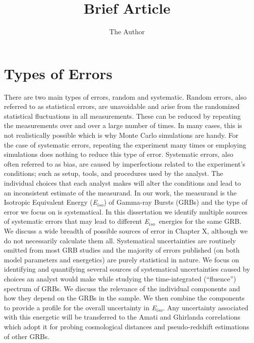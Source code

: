 \documentclass[11pt, oneside]{article}   	%
\title{Brief Article}
\author{The Author}
\newcommand{\eiso}{\textit{E$_{iso}$}}
\begin{document}
\maketitle

\section{Types of Errors}
There are two main types of errors, random and systematic. Random errors, also referred to as statistical errors, are unavoidable and arise from the randomized statistical fluctuations in all measurements. These can be reduced by repeating the measurements over and over a large number of times. In many cases, this is not realistically possible which is why Monte Carlo simulations are handy. For the case of systematic errors, repeating the experiment many times or employing simulations does nothing to reduce this type of error. Systematic errors, also often referred to as bias, are caused by imperfections related to the experiment's conditions; such as setup, tools, and procedures used by the analyst. The individual choices that each analyst makes will alter the conditions and lead to an inconsistent estimate of the measurand. In our work, the measurand is the Isotropic Equivalent Energy (\eiso) of Gamma-ray Bursts (GRBs) and the type of error we focus on is systematical. In this dissertation we identify multiple sources of systematic errors that may lead to different \eiso \ energies for the same GRB. We discuss a wide breadth of possible sources of error in Chapter X, although we do not necessarily calculate them all. Systematical uncertainties are routinely omitted from most GRB studies and the majority of errors published (on both model parameters and energetics) are purely statistical in nature. We focus on identifying and quantifying several sources of systematical uncertainties caused by choices an analyst would make while studying the time-integrated (``fluence'') spectrum of GRBs. 
We discuss the relevance of the individual components and how they depend on the GRBs in the sample. We then combine the components to provide a profile for the overall uncertainty in \eiso. 
Any uncertainty associated with this energetic will be transferred to the Amati and Ghirlanda correlations which adopt it for probing cosmological distances and pseudo-redshift estimations of other GRBs. 
\end{document}
